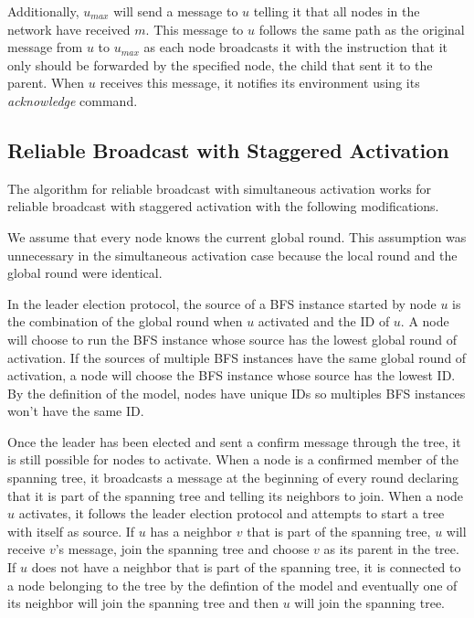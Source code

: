 \documentclass[english]{article}
\begin{document}
Additionally, $u_{max}$ will send a message to $u$ telling it that all nodes in the network have received $m$. This message to $u$ follows the same path as the original message from $u$ to $u_{max}$ as each node broadcasts it with the instruction that it only should be forwarded by the specified node, the child that sent it to the parent. When $u$ receives this message, it notifies its environment using its \textit{acknowledge} command.


  \subsection {Reliable Broadcast with Staggered Activation}

The algorithm for reliable broadcast with simultaneous activation works for reliable broadcast with staggered activation with the following modifications.

We assume that every node knows the current global round. This assumption was unnecessary in the simultaneous activation case because the local round and the global round were identical.

In the leader election protocol, the source of a BFS instance started by node $u$ is the combination of the global round when $u$ activated and the ID of $u$. A node will choose to run the BFS instance whose source has the lowest global round of activation. If the sources of multiple BFS instances have the same global round of activation, a node will choose the BFS instance whose source has the lowest ID. By the definition of the model, nodes have unique IDs so multiples BFS instances won't have the same ID.

Once the leader has been elected and sent a confirm message through the tree, it is still possible for nodes to activate. When a node is a confirmed member of the spanning tree, it broadcasts a message at the beginning of every round declaring that it is part of the spanning tree and telling its neighbors to join. When a node $u$ activates, it follows the leader election protocol and attempts to start a tree with itself as source. If $u$ has a neighbor $v$ that is part of the spanning tree, $u$ will receive $v$'s message, join the spanning tree and choose $v$ as its parent in the tree. If $u$ does not have a neighbor that is part of the spanning tree, it is connected to a node belonging to the tree by the defintion of the model and eventually one of its neighbor will join the spanning tree and then $u$ will join the spanning tree.
\end{document}
